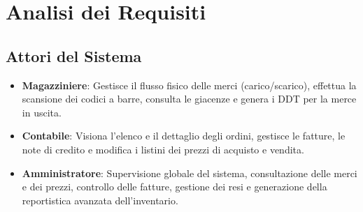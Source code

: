 \documentclass[a4paper,12pt]{article}
\begin{document}
\section{Analisi dei Requisiti}
\subsection{Attori del Sistema}
\begin{itemize}
    \item \textbf{Magazziniere}: Gestisce il flusso fisico delle merci (carico/scarico), effettua la scansione dei codici a barre, consulta le giacenze e genera i DDT per la merce in uscita.
    \item \textbf{Contabile}: Visiona l'elenco e il dettaglio degli ordini, gestisce le fatture, le note di credito e modifica i listini dei prezzi di acquisto e vendita.
    \item \textbf{Amministratore}: Supervisione globale del sistema, consultazione delle merci e dei prezzi, controllo delle fatture, gestione dei resi e generazione della reportistica avanzata dell'inventario.
\end{itemize}
\end{document}
